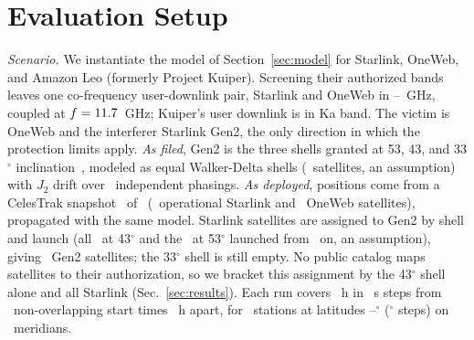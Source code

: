 \documentclass[conference]{IEEEtran}
\begin{document}
\section{Evaluation Setup}
\label{sec:setup}

\emph{Scenario.} We instantiate the model of Section~\ref{sec:model} for
Starlink, OneWeb, and Amazon Leo (formerly Project Kuiper). Screening their
authorized bands leaves one co-frequency user-downlink pair, Starlink and OneWeb
in \SharedBandLoGhz--\SharedBandHiGhz~GHz, coupled at $f = 11.7$~GHz;
Kuiper's user downlink is in Ka band. The victim is OneWeb and the interferer
Starlink Gen2, the only direction in which the protection limits apply. \emph{As filed}, Gen2 is
the three shells granted at 53, 43, and 33$^\circ$ inclination~\cite{fcc2291},
modeled as equal Walker-Delta shells (\FilGenTwoNSats\ satellites, an assumption)
with $J_2$ drift over \EventNPhasings\ independent phasings. \emph{As deployed},
positions come from a CelesTrak snapshot~\cite{celestrak} of \SnapshotDate\
(\NStarlinkOperational\ operational Starlink and \NOnewebOp\ OneWeb satellites),
propagated with the same model. Starlink satellites are assigned to Gen2 by
shell and launch (all \NSatsFortyThree\ at 43$^\circ$ and the
\NSatsFiftyThreeGenTwo\ at 53$^\circ$ launched from \GenTwoLaunchCutoff\ on, an
assumption), giving \NStarlinkGenTwo\ Gen2 satellites; the 33$^\circ$ shell is
still empty. No public catalog maps satellites to their authorization, so we
bracket this assignment by the 43$^\circ$ shell alone and all Starlink (Sec.~\ref{sec:results}). Each run covers \DurationH~h in \TimeStepS~s steps from
\NStartTimes\ non-overlapping start times \StartSpacingH~h apart, for \NStations\
stations at latitudes \LatMinDeg--\LatMaxDeg$^\circ$ (\LatStepDeg$^\circ$ steps)
on \NLongitudes\ meridians.
\end{document}
